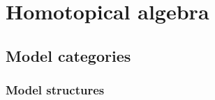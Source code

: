 \documentclass{../../large}
\begin{document}
\chapter{}








\part{Homotopical algebra}

\chapter{Model categories}

\section{Model structures}
\end{document}
